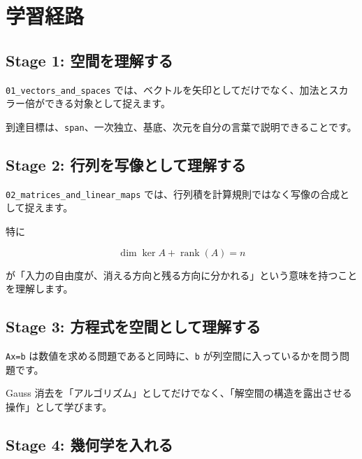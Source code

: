 \documentclass[
  11pt,
  a4paper,
]{ltjsarticle}
\author{}
\date{}
\begin{document}
\hypertarget{ux5b66ux7fd2ux7d4cux8def}{%
\section{学習経路}\label{ux5b66ux7fd2ux7d4cux8def}}

\hypertarget{stage-1-ux7a7aux9593ux3092ux7406ux89e3ux3059ux308b}{%
\subsection{Stage 1:
空間を理解する}\label{stage-1-ux7a7aux9593ux3092ux7406ux89e3ux3059ux308b}}

\texttt{01\_vectors\_and\_spaces}
では、ベクトルを矢印としてだけでなく、加法とスカラー倍ができる対象として捉えます。

到達目標は、\texttt{span}、一次独立、基底、次元を自分の言葉で説明できることです。

\hypertarget{stage-2-ux884cux5217ux3092ux5199ux50cfux3068ux3057ux3066ux7406ux89e3ux3059ux308b}{%
\subsection{Stage 2:
行列を写像として理解する}\label{stage-2-ux884cux5217ux3092ux5199ux50cfux3068ux3057ux3066ux7406ux89e3ux3059ux308b}}

\texttt{02\_matrices\_and\_linear\_maps}
では、行列積を計算規則ではなく写像の合成として捉えます。

特に

\[
\dim\ker A+\operatorname{rank}(A)=n
\]

が「入力の自由度が、消える方向と残る方向に分かれる」という意味を持つことを理解します。

\hypertarget{stage-3-ux65b9ux7a0bux5f0fux3092ux7a7aux9593ux3068ux3057ux3066ux7406ux89e3ux3059ux308b}{%
\subsection{Stage 3:
方程式を空間として理解する}\label{stage-3-ux65b9ux7a0bux5f0fux3092ux7a7aux9593ux3068ux3057ux3066ux7406ux89e3ux3059ux308b}}

\texttt{Ax=b} は数値を求める問題であると同時に、\texttt{b}
が列空間に入っているかを問う問題です。

Gauss
消去を「アルゴリズム」としてだけでなく、「解空間の構造を露出させる操作」として学びます。

\hypertarget{stage-4-ux5e7eux4f55ux5b66ux3092ux5165ux308cux308b}{%
\subsection{Stage 4:
幾何学を入れる}\label{stage-4-ux5e7eux4f55ux5b66ux3092ux5165ux308cux308b}}
\end{document}
